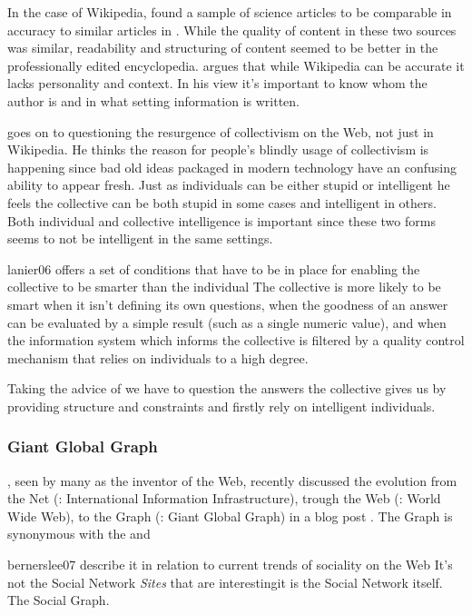 In the case of Wikipedia, \citet{giles05} found a sample of science articles
to be comparable in accuracy to similar articles in
. While the quality of content in
these two sources was similar, readability and structuring of content seemed
to be better in the professionally edited encyclopedia.
\citet{lanier06} argues that while Wikipedia can be accurate it lacks
personality and context. In his view it's important to know whom the author is
and in what setting information is written.

\citet{lanier06} goes on to questioning the resurgence of collectivism on the
Web, not just in Wikipedia.
He thinks the reason for people's blindly usage of collectivism is happening
since bad old ideas packaged in modern technology have an confusing ability to
appear fresh. Just as individuals can be either
stupid or intelligent he feels the collective can be both stupid in some cases
and intelligent in others. Both individual and collective intelligence is
important since these two forms seems to not be intelligent in the same
settings.

\begin{fullquote}{lanier06}{%
  offers a set of conditions that have to be in place for enabling the
  collective to be smarter than the individual}
    The collective is more likely to be smart when it isn't defining its own
    questions, when the goodness of an answer can be evaluated by a simple
    result (such as a single numeric value), and when the information system
    which informs the collective is filtered by a quality control mechanism
    that relies on individuals to a high degree.
\end{fullquote}

Taking the advice of \citeauthor{lanier06} we have to question the answers
the collective gives us by providing structure and constraints and firstly
rely on intelligent individuals.

\subsubsection{Giant Global Graph}
\citeauthor{bernerslee07}, seen by many as the inventor of the Web,
recently discussed the evolution from the Net (: International
Information Infrastructure), trough the Web (: World Wide Web),
to the Graph (: Giant Global Graph) in a
blog post \citeyearpar{bernerslee07}. The Graph is synonymous with the
%
and
\begin{fullquote}{bernerslee07}{%
  describe it in relation to current trends of sociality on the Web}
    It's not the Social Network \emph{Sites} that are interesting\dash{}it is
    the Social Network itself. The Social Graph.
\end{fullquote}

